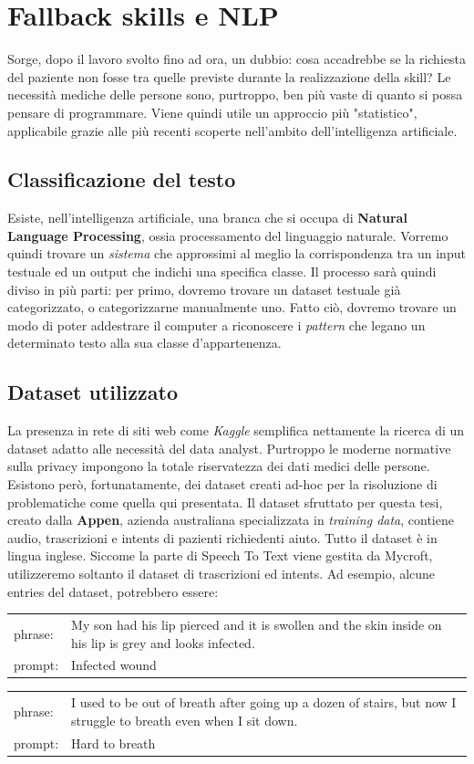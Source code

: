 \chapter{Fallback skills e NLP}
\label{chap:fallback}
Sorge, dopo il lavoro svolto fino ad ora, un dubbio: cosa accadrebbe se la richiesta del paziente non fosse tra quelle previste durante la realizzazione della skill?
Le necessità mediche delle persone sono, purtroppo, ben più vaste di quanto si possa pensare di programmare. Viene quindi utile un approccio più "statistico", applicabile grazie alle più recenti scoperte nell'ambito dell'intelligenza artificiale.
\section{Classificazione del testo}
Esiste, nell'intelligenza artificiale, una branca che si occupa di \textbf{Natural Language Processing}, ossia processamento del linguaggio naturale. Vorremo quindi trovare un \textit{sistema} che approssimi al meglio la corrispondenza tra un input testuale ed un output che indichi una specifica classe. Il processo sarà quindi diviso in più parti: per primo, dovremo trovare un dataset testuale già categorizzato, o categorizzarne manualmente uno. Fatto ciò, dovremo trovare un modo di poter addestrare il computer a riconoscere i \textit{pattern} che legano un determinato testo alla sua classe d'appartenenza.
\section{Dataset utilizzato}
La presenza in rete di siti web come \textit{Kaggle} semplifica nettamente la ricerca di un dataset adatto alle necessità del data analyst. Purtroppo le moderne normative sulla privacy impongono la totale riservatezza dei dati medici delle persone. Esistono però, fortunatamente, dei dataset creati ad-hoc per la risoluzione di problematiche come quella qui presentata. Il dataset sfruttato per questa tesi\cite{dataset:medical-speech}, creato dalla \textbf{Appen}, azienda australiana specializzata in \textit{training data}, contiene audio, trascrizioni e intents di pazienti richiedenti aiuto. Tutto il dataset è in lingua inglese. Siccome la parte di Speech To Text viene gestita da Mycroft, utilizzeremo soltanto il dataset di trascrizioni ed intents. Ad esempio, alcune entries del dataset, potrebbero essere:
\begin{table}[H]
    \begin{tabularx}{\textwidth}{|l|X|}
        phrase: & My son had his lip pierced and it is swollen and the skin inside on his lip is grey and looks infected.
        \\
        prompt: & Infected wound
    \end{tabularx}
\end{table}
\begin{table}[H]
    \begin{tabularx}{\textwidth}{|l|X|}
        phrase: & I used to be out of breath after going up a dozen of stairs, but now I struggle to breath even when I sit down.
        \\
        prompt: & Hard to breath
    \end{tabularx}
\end{table}
